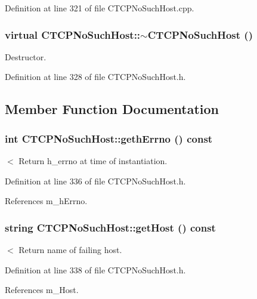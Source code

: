 Definition at line 321 of file CTCPNo\-Such\-Host.cpp.
\subsubsection{\setlength{\rightskip}{0pt plus 5cm}virtual CTCPNo\-Such\-Host::$\sim$CTCPNo\-Such\-Host ()\hspace{0.3cm}{\tt  [inline, virtual]}}\label{classCTCPNoSuchHost_a2}


Destructor.



Definition at line 328 of file CTCPNo\-Such\-Host.h.

\subsection{Member Function Documentation}
\subsubsection{\setlength{\rightskip}{0pt plus 5cm}int CTCPNo\-Such\-Host::geth\-Errno () const\hspace{0.3cm}{\tt  [inline]}}\label{classCTCPNoSuchHost_a5}


$<$ Return h\_\-errno at time of instantiation.



Definition at line 336 of file CTCPNo\-Such\-Host.h.

References m\_\-h\-Errno.
\subsubsection{\setlength{\rightskip}{0pt plus 5cm}string CTCPNo\-Such\-Host::get\-Host () const\hspace{0.3cm}{\tt  [inline]}}\label{classCTCPNoSuchHost_a6}


$<$ Return name of failing host.



Definition at line 338 of file CTCPNo\-Such\-Host.h.

References m\_\-Host.
